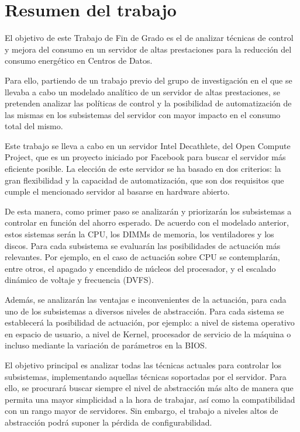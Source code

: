 \section*{Resumen del trabajo}
El objetivo de este Trabajo de Fin de Grado es el de analizar técnicas de control y mejora del consumo en un servidor de altas prestaciones para la reducción del consumo energético en Centros de Datos. 

Para ello, partiendo de un trabajo previo del grupo de investigación en el que se llevaba a cabo un modelado analítico de un servidor de altas prestaciones, se pretenden analizar las políticas de control y la posibilidad de automatización de las mismas en los subsistemas del servidor con mayor impacto en el consumo total del mismo. 

Este trabajo se lleva a cabo en un servidor Intel Decathlete, del Open Compute Project, que es un proyecto iniciado por Facebook para buscar el servidor más eficiente posible. La elección de este servidor se ha basado en dos criterios: la gran flexibilidad y la capacidad de automatización, que son dos requisitos que cumple el mencionado servidor al basarse en hardware abierto.

De esta manera, como primer paso se analizarán y priorizarán los subsistemas a controlar en función del ahorro esperado. De acuerdo con el modelado anterior, estos sistemas serán la CPU, los DIMMs de memoria, los ventiladores y los discos. Para cada subsistema se evaluarán las posibilidades de actuación más relevantes. Por ejemplo, en el caso de actuación sobre CPU se contemplarán, entre otros, el apagado y encendido de núcleos del procesador, y el escalado dinámico de voltaje y frecuencia (DVFS).  

Además, se analizarán las ventajas e inconvenientes de la actuación, para cada uno de los subsistemas a diversos niveles de abstracción. Para cada sistema se establecerá la posibilidad de actuación, por ejemplo: a nivel de sistema operativo en espacio de usuario, a nivel de Kernel, procesador de servicio de la máquina o incluso mediante la variación de parámetros en la BIOS. 

El objetivo principal es analizar todas las técnicas actuales para controlar los subsistemas, implementando aquellas técnicas soportadas por el servidor. Para ello, se procurará buscar siempre el nivel de abstracción más alto de manera que permita una mayor simplicidad a la hora de trabajar, así como la compatibilidad con un rango mayor de servidores. Sin embargo, el trabajo a niveles altos de abstracción podrá suponer la pérdida de configurabilidad. 

